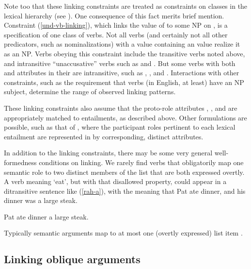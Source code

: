 \documentclass[output=paper]{langsci/langscibook}
\begin{document}
Note too that these linking constraints are treated as constraints on classes in the lexical hierarchy (see ).
One consequence of this fact merits brief mention.
Constraint (\ref{und-vb-linking}), which links the value of  to some NP on \argst, is a specification of one class of verbs.
Not all verbs (and certainly not all other predicators, such as nominalizations) with a \content value containing an  value realize it as an NP.
Verbs obeying this constraint include the transitive verbs noted above, and intransitive ``unaccusative'' verbs such as  and .
But some verbs with both  and  attributes in their \content are intransitive, such as , , and .
Interactions with other constraints, such as the requirement that verbs (in English, at least) have an NP subject, determine the range of observed linking patterns.

These linking constraints also assume that the proto-role attributes , , and  are appropriately matched to entailments, as described above.
Other formulations are possible, such as that of \citet{KoenigandDavis2003}, where the participant roles pertinent to each lexical entailment are represented in \content by corresponding, distinct attributes.

In addition to the linking constraints, there may be some very general well-formedness conditions on linking.  We rarely find verbs that obligatorily map one semantic role to two distinct members of the \argst list that are both expressed overtly.  A verb meaning `eat', but with that disallowed property, could appear in a ditransitive sentence like (\ref{rah-a}), with the meaning that Pat ate dinner, and his dinner was a large steak.  

\begin{exe}
\label{rah-a} 
	\ex *Pat ate dinner a large steak.
\end{exe}

\noindent
Typically semantic arguments map to at most one (overtly expressed) \argst list item \citep[262-268]{Davis2001}.  

\subsection{Linking oblique arguments}
\end{document}
